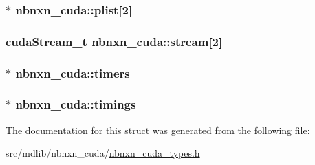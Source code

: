 \hypertarget{structnbnxn__cuda_a08eaad7726f9bffa4b59f9c512e651ea}{
\subsubsection[{plist}]{$\ast$ {\bf nbnxn\-\_\-cuda\-::plist}\mbox{[}2\mbox{]}}}\label{structnbnxn__cuda_a08eaad7726f9bffa4b59f9c512e651ea}
\hypertarget{structnbnxn__cuda_ace7fa34883dfdcdc600dc32eefc5f9cb}{
\subsubsection[{stream}]{\setlength{\rightskip}{0pt plus 5cm}cuda\-Stream\-\_\-t {\bf nbnxn\-\_\-cuda\-::stream}\mbox{[}2\mbox{]}}}\label{structnbnxn__cuda_ace7fa34883dfdcdc600dc32eefc5f9cb}
\hypertarget{structnbnxn__cuda_a1b2be2186712b304e07892692015c695}{
\subsubsection[{timers}]{$\ast$ {\bf nbnxn\-\_\-cuda\-::timers}}}\label{structnbnxn__cuda_a1b2be2186712b304e07892692015c695}
\hypertarget{structnbnxn__cuda_a2b3d43a9134641c587a926e679eb55ab}{
\subsubsection[{timings}]{$\ast$ {\bf nbnxn\-\_\-cuda\-::timings}}}\label{structnbnxn__cuda_a2b3d43a9134641c587a926e679eb55ab}


\-The documentation for this struct was generated from the following file\-:\begin{DoxyCompactItemize}
\item 
src/mdlib/nbnxn\-\_\-cuda/\hyperlink{nbnxn__cuda__types_8h}{nbnxn\-\_\-cuda\-\_\-types.\-h}\end{DoxyCompactItemize}
